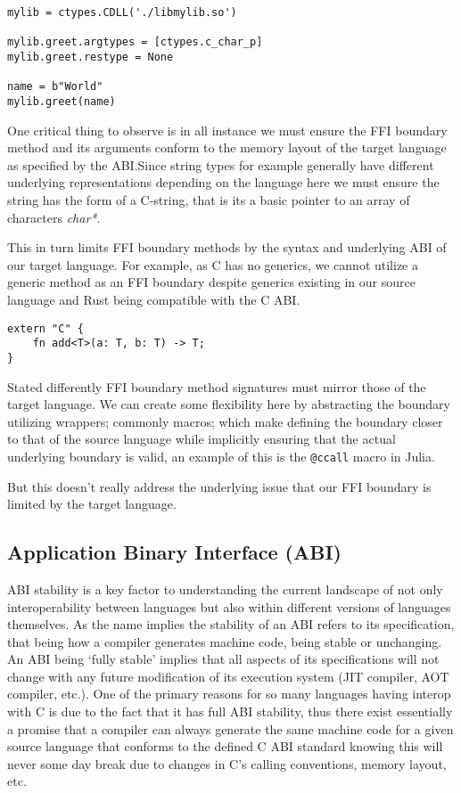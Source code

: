 \begin{verbatim}
mylib = ctypes.CDLL('./libmylib.so')

mylib.greet.argtypes = [ctypes.c_char_p]  
mylib.greet.restype = None                  

name = b"World"  
mylib.greet(name)
\end{verbatim}

One critical thing to observe is in all instance we must ensure the FFI boundary method and its arguments conform to the memory layout of the target language as specified by the ABI.\@ Since string types for example generally have different underlying representations depending on the language here we must ensure the string has the form of a C-string, that is its a basic pointer to an array of characters \textit{char*}.

This in turn limits FFI boundary methods by the syntax and underlying ABI of our target language. For example, as C has no generics, we cannot utilize a generic method as an FFI boundary despite generics existing in our source language and Rust being compatible with the C ABI.\@

\begin{verbatim}
extern "C" { 
    fn add<T>(a: T, b: T) -> T; 
}
\end{verbatim}

Stated differently FFI boundary method signatures must mirror those of the target language. We can create some flexibility here by abstracting the boundary utilizing wrappers; commonly macros; which make defining the boundary closer to that of the source language while implicitly ensuring that the actual underlying boundary is valid, an example of this is the \texttt{@ccall} macro in Julia.

But this doesn't really address the underlying issue that our FFI boundary is limited by the target language. 

\subsection{Application Binary Interface (ABI)}

ABI stability is a key factor to understanding the current landscape of not only interoperability between languages but also within different versions of languages themselves. As the name implies the stability of an ABI refers to its specification, that being how a compiler generates machine code, being stable or unchanging. An ABI being `fully stable' implies that all aspects of its specifications will not change with any future modification of its execution system (JIT compiler, AOT compiler, etc.). One of the primary reasons for so many languages having interop with C is due to the fact that it has full ABI stability, thus there exist essentially a promise that a compiler can always generate the same machine code for a given source language that conforms to the defined C ABI standard knowing this will never some day break due to changes in C's calling conventions, memory layout, etc. 

